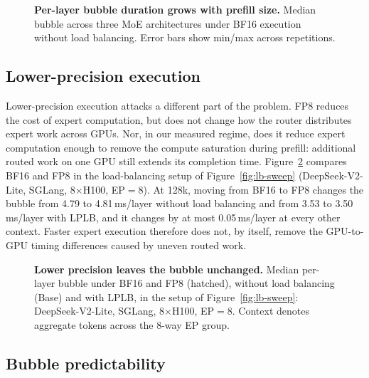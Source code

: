 \begin{figure}[t]
  \centering
  \caption{
    \textbf{Per-layer bubble duration grows with prefill size.}
    Median bubble across three \ac{MoE} architectures under BF16
    execution without load balancing. Error bars show min/max across
    repetitions.
  }
  \label{fig:context}
\end{figure}

\subsection{Lower-precision execution}
\label{sec:appx-fp8}

Lower-precision execution attacks a different part of the problem.
FP8 reduces the cost of expert computation, but does not change how
the router distributes expert work across GPUs. Nor, in our measured
regime, does it reduce expert computation enough to remove the
compute saturation during prefill: additional routed work on one GPU
still extends its completion time. Figure~\ref{fig:appx-fp8} compares
BF16 and FP8 in the load-balancing setup of Figure~\ref{fig:lb-sweep}
(DeepSeek-V2-Lite, SGLang, 8$\times$H100, \ac{EP}$=8$). At 128k,
moving from BF16 to FP8 changes the bubble from 4.79 to 4.81\,ms/layer
without load balancing and from 3.53 to 3.50\,ms/layer with LPLB, and
it changes by at most 0.05\,ms/layer at every other context. Faster
expert execution therefore does not, by itself, remove the GPU-to-GPU
timing differences caused by uneven routed work.

\begin{figure}[t]
  \centering
  \caption{\textbf{Lower precision leaves the bubble unchanged.}
    Median per-layer bubble under BF16 and FP8 (hatched), without load
    balancing (Base) and with LPLB, in the setup of
    Figure~\ref{fig:lb-sweep}: DeepSeek-V2-Lite, SGLang, 8$\times$H100,
    \ac{EP}$=8$. Context denotes aggregate tokens across the 8-way
    \ac{EP} group.}
  \label{fig:appx-fp8}
\end{figure}
\subsection{Bubble predictability}
\label{sec:appx-predict}

